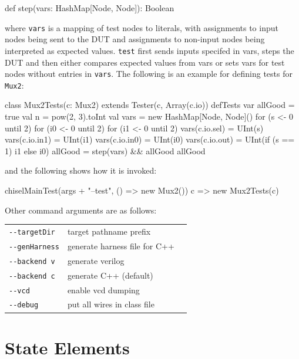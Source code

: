 \documentclass[twocolumn,10pt]{article}
\def\code#1{{\tt #1}}
\begin{document}
\begin{scala}
def step(vars: HashMap[Node, Node]): Boolean
\end{scala}

\noindent
where \code{vars} is a mapping of test nodes to literals, 
with assignments to input nodes being sent to the DUT and assignments to
non-input nodes being interpreted as expected values.
\code{test} first sends inputs specifed in vars, steps the DUT and then either
compares expected values from vars or sets vars for test nodes without
entries in \code{vars}.
The following is an example for defining tests for \code{Mux2}:

\begin{scala}
class Mux2Tests(c: Mux2) 
    extends Tester(c, Array(c.io)) {  
  defTests {
    var allGood = true
    val n = pow(2, 3).toInt
    val vars = new HashMap[Node, Node]()
    for (s <- 0 until 2) {
    for (i0 <- 0 until 2) {
    for (i1 <- 0 until 2) {
      vars(c.io.sel) = UInt(s)
      vars(c.io.in1) = UInt(i1)
      vars(c.io.in0) = UInt(i0)
      vars(c.io.out) = UInt(if (s == 1) i1 else i0)
      allGood = step(vars) && allGood
    } } } 
    allGood
  }
}
\end{scala}

\noindent
and the following shows how it is invoked:

\begin{scala}
chiselMainTest(args + "--test", () => new Mux2()){ 
  c => new Mux2Tests(c) 
}
\end{scala}


Other command arguments are as follows:
\begin{tabular}{lll}
\verb+--targetDir+ & target pathname prefix \\
\verb+--genHarness+ & generate harness file for C++ \\
\verb+--backend v+ & generate verilog \\
\verb+--backend c+ & generate C++ (default)\\
\verb+--vcd+ & enable vcd dumping \\
\verb+--debug+ & put all wires in class file \\
\end{tabular}

\section{State Elements}
\label{sec:sequential}

\end{document}
